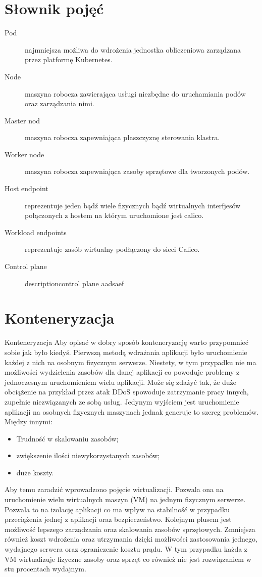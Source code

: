 \documentclass[pl,final,oneside]{mgr} %
\begin{document}
\section{Słownik pojęć}
\begin{description}
\item[Pod] najmniejsza możliwa do wdrożenia jednostka obliczeniowa zarządzana przez platformę Kubernetes.
\item[Node] maszyna robocza zawierająca usługi niezbędne do uruchamiania podów oraz zarządzania nimi.
\item[Master nod] maszyna robocza zapewniająca płaszczyznę sterowania klastra.
\item[Worker node] maszyna robocza zapewniająca zasoby sprzętowe dla tworzonych podów.
\item[Host endpoint] reprezentuje jeden bądź wiele fizycznych bądź wirtualnych interfjesów połączonych z hostem na którym uruchomione jest calico.
\item[Workload endpoints] reprezentuje zasób wirtualny podłączony do sieci Calico.
\item[Control plane] descriptioncontrol plane   aadsaef
\end{description}
\section{Konteneryzacja}
Konteneryzacja
Aby opisać w dobry sposób konteneryzację warto przypomnieć sobie jak było kiedyś. Pierwszą metodą wdrażania aplikacji było uruchomienie każdej z nich na osobnym fizycznym serwerze. Niestety, w tym przypadku nie ma możliwości wydzielenia zasobów dla danej aplikacji co powoduje problemy z jednoczesnym uruchomieniem wielu aplikacji. Może się zdażyć tak, że duże obciążenie na przykład przez atak DDoS spowoduje zatrzymanie pracy innych, zupełnie niezwiązanych ze sobą usług. Jedynym wyjściem jest uruchomienie aplikacji na osobnych fizycznych maszynach jednak generuje to szereg problemów. Między innymi:
\begin{itemize}
	\item Trudność w skalowaniu zasobów;
	\item zwiększenie ilości niewykorzystanych zasobów;
	\item duże koszty.
\end{itemize}
Aby temu zaradzić wprowadzono pojęcie wirtualizacji. Pozwala ona na uruchomienie wielu wirtualnych maszyn (VM) na jednym fizycznym serwerze. Pozwala to na izolację aplikacji co ma wpływ na stabilność w przypadku przeciążenia jednej z aplikacji oraz bezpieczeństwo. Kolejnym plusem jest możliwość lepszego zarządzania oraz skalowania zasobów sprzętowych.  Zmniejsza również koszt wdrożenia oraz utrzymania dzięki możliwości zastosowania jednego, wydajnego serwera oraz ograniczenie kosztu prądu. W tym przypadku każda z VM wirtualizuje fizyczne zasoby oraz sprzęt co również nie jest rozwiązaniem w stu procentach wydajnym.
\end{document}
